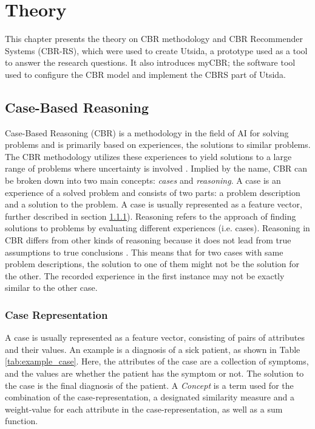 \cleardoublepage

\chapter{Theory}

This chapter presents the theory on CBR methodology and CBR Recommender Systems (CBR-RS), which were used to create Utsida, a prototype used as a tool to answer the research questions. It also introduces myCBR; the software tool used to configure the CBR model and implement the CBRS part of Utsida. 

\section{Case-Based Reasoning}

Case-Based Reasoning (CBR) is a methodology in the field of AI for solving problems and is primarily based on experiences, the solutions to similar problems. The CBR methodology utilizes these experiences to yield solutions to a large range of problems where uncertainty is involved \cite{richter2013case}. Implied by the name, CBR can be broken down into two main concepts: \textit{cases} and \textit{reasoning}. A case is an experience of a solved problem and consists of two parts: a problem description and a solution to the problem. A case is usually represented as a feature vector, further described in section \ref{sec:feature_vectors}). Reasoning refers to the approach of finding solutions to problems by evaluating different experiences (i.e. cases). Reasoning in CBR differs from other kinds of reasoning because it does not lead from true assumptions to true conclusions \cite{richter2013case}. This means that for two cases with same problem descriptions, the solution to one of them might not be the solution for the other. The recorded experience in the first instance may not be exactly similar to the other case.
    
\subsection{Case Representation}\label{sec:feature_vectors}
A case is usually represented as a feature vector, consisting of pairs of attributes and their values. An example is a diagnosis of a sick patient, as shown in Table \ref{tab:example_case}. Here, the attributes of the case are a collection of symptoms, and the values are whether the patient has the symptom or not. The solution to the case is the final diagnosis of the patient. A \textit{Concept} is a term used for the combination of the case-representation, a designated similarity measure and a weight-value for each attribute in the case-representation, as well as a sum function.


